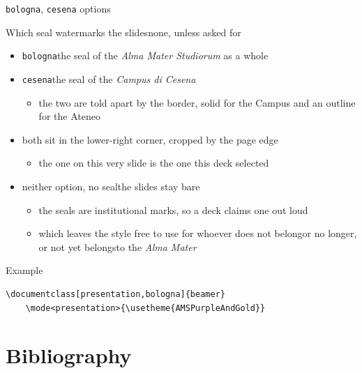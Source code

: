 \documentclass[presentation,cesena,apice]{beamer}\mode<presentation>{\usetheme{AMSPurpleAndGold}}
\begin{document}
\begin{frame}[c,fragile]{\texttt{bologna}, \texttt{cesena} options}
%
\begin{alertblock}{Which seal watermarks the slides\textemdash{}none, unless asked for}
\begin{itemize}
	\item \texttt{bologna}\textemdash{}the seal of the \emph{Alma Mater Studiorum} as a whole
	\item \texttt{cesena}\textemdash{}the seal of the \emph{Campus di Cesena}
	\begin{itemize}
		\item the two are told apart by the border, solid for the Campus and an outline for the Ateneo
	\end{itemize}
	\item both sit in the lower-right corner, cropped by the page edge
	\begin{itemize}
		\item the one on this very slide is the one this deck selected
	\end{itemize}
	\item \alert{neither option, no seal}\textemdash{}the slides stay bare
	\begin{itemize}
		\item the seals are institutional marks, so a deck claims one out loud
		\item which leaves the style free to use for whoever does not belong\textemdash{}or no longer, or not yet belongs\textemdash{}to the \emph{Alma Mater}
	\end{itemize}
\end{itemize}
\end{alertblock}
%
\begin{exampleblock}{Example}
{\scriptsize\begin{verbatim}
\documentclass[presentation,bologna]{beamer}
    \mode<presentation>{\usetheme{AMSPurpleAndGold}}
\end{verbatim}} %
\end{exampleblock}
%
\end{frame}

\section{Bibliography}
\end{document}
